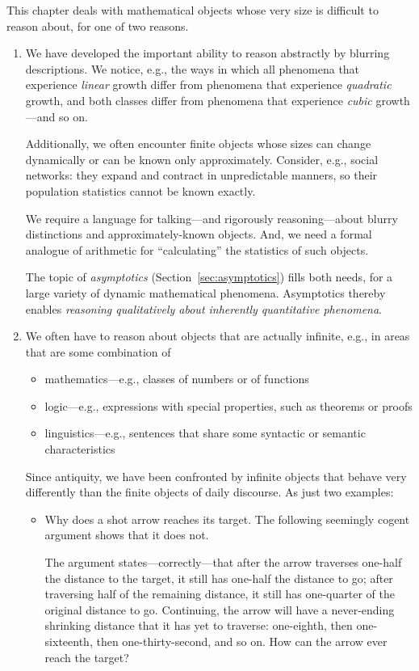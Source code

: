 This chapter deals with mathematical objects whose very size is
difficult to reason about, for one of two reasons.
\begin{enumerate}
\item
We have developed the important ability to reason abstractly by
blurring descriptions.  We notice, e.g., the ways in which all
phenomena that experience {\em linear} growth differ from phenomena
that experience {\em quadratic} growth, and both classes differ from
phenomena that experience {\em cubic} growth---and so on.

Additionally, we often encounter finite objects whose sizes can change
dynamically or can be known only approximately.  Consider, e.g.,
social networks: they expand and contract in unpredictable manners, so
their population statistics cannot be known exactly.

We require a language for talking---and rigorously reasoning---about
blurry distinctions and approximately-known objects.  And, we need a
formal analogue of arithmetic for ``calculating'' the statistics of
such objects.

The topic of {\it asymptotics} (Section~\ref{sec:asymptotics}) fills
both needs, for a large variety of dynamic mathematical phenomena.
Asymptotics thereby enables {\em reasoning qualitatively about
  inherently quantitative phenomena}.

\item
We often have to reason about objects that are actually infinite,
e.g., in areas that are some combination of
  \begin{itemize}
  \item
mathematics---e.g., classes of numbers or of functions
  \item
logic---e.g., expressions with special properties, such as theorems or
proofs
  \item
linguistics---e.g., sentences that share some syntactic or semantic
characteristics
  \end{itemize}
Since antiquity, we have been confronted by infinite objects that
behave very differently than the finite objects of daily discourse.
As just two examples:
  \begin{itemize}
  \item
Why does a shot arrow reaches its target.  The following seemingly
cogent argument shows that it does not.

The argument states---correctly---that after the arrow traverses
one-half the distance to the target, it still has one-half the
distance to go; after traversing half of the remaining distance, it
still has one-quarter of the original distance to go.  Continuing, the
arrow will have a never-ending shrinking distance that it has yet to
traverse: one-eighth, then one-sixteenth, then one-thirty-second, and
so on.  How can the arrow ever reach the target?


\end{itemize}
\end{enumerate}
